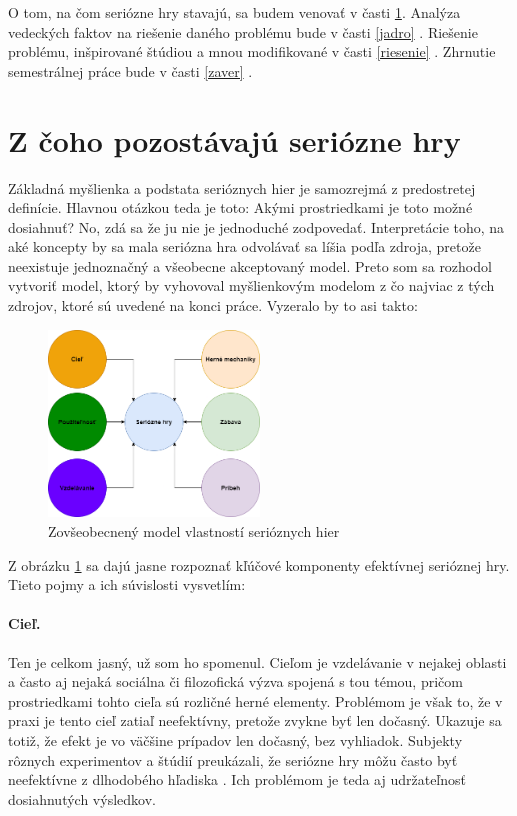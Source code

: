 \documentclass[10pt,twoside,slovak,a4paper]{article}
\begin{document}
O tom, na čom seriózne hry stavajú, sa budem venovať v časti \ref{ciel}.
Analýza vedeckých faktov na riešenie daného problému bude v časti \ref{jadro} .
Riešenie problému, inšpirované štúdiou \cite{natucci2021experience} a mnou modifikované v časti \ref{riesenie} .
Zhrnutie semestrálnej práce bude v časti \ref{zaver} .

\section{Z čoho pozostávajú seriózne hry} \label{ciel}
Základná myšlienka a podstata serióznych hier je samozrejmá z predostretej definície. Hlavnou otázkou teda je toto: Akými prostriedkami je toto možné dosiahnuť?
No, zdá sa že ju nie je jednoduché zodpovedať. Interpretácie toho, na aké koncepty by sa mala seriózna hra odvolávať sa líšia podľa zdroja, pretože neexistuje jednoznačný a všeobecne akceptovaný model. Preto som sa rozhodol vytvoriť model, ktorý by vyhovoval myšlienkovým modelom z čo najviac z tých zdrojov, ktoré sú uvedené na konci práce. Vyzeralo by to asi takto:

\begin{figure}[h]
\centering
\includegraphics[width = 0.5\textwidth]{serious_games.png}
\caption{Zovšeobecnený model vlastností serióznych hier}
\label{fig:model}
\end{figure}

Z obrázku \ref{fig:model} sa dajú jasne rozpoznať kľúčové komponenty efektívnej serióznej hry. Tieto pojmy a ich súvislosti vysvetlím:
\paragraph{Cieľ.} Ten je celkom jasný, už som ho spomenul. Cieľom je vzdelávanie v nejakej oblasti a často aj nejaká sociálna či filozofická výzva spojená s tou témou, pričom prostriedkami tohto cieľa sú rozličné herné elementy. Problémom je však to, že v praxi je tento cieľ zatiaľ neefektívny, pretože zvykne byť len dočasný. Ukazuje sa totiž, že efekt je vo väčšine prípadov len dočasný, bez vyhliadok. Subjekty rôznych experimentov a štúdií preukázali, že seriózne hry môžu často byť neefektívne z dlhodobého hľadiska \cite{lewis2007analysis}. Ich problémom je teda aj udržateľnosť dosiahnutých výsledkov.
\end{document}
